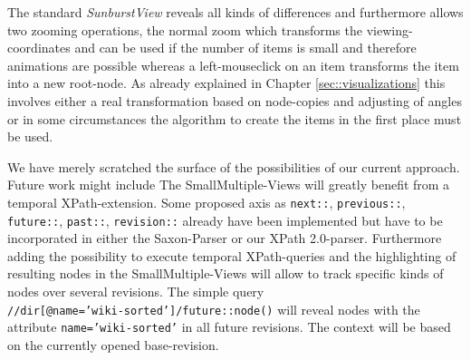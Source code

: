 The standard \emph{SunburstView} reveals all kinds of differences and furthermore allows two zooming operations, the normal zoom which transforms the viewing-coordinates and can be used if the number of items is small and therefore animations are possible whereas a left-mouseclick on an item transforms the item into a new root-node. As already explained in Chapter \ref{sec::visualizations} this involves either a real transformation based on node-copies and adjusting of angles or in some circumstances the algorithm to create the items in the first place must be used.

We have merely scratched the surface of the possibilities of our current approach. Future work might include  The SmallMultiple-Views will greatly benefit from a temporal XPath-extension. Some proposed axis as \texttt{next::}, \texttt{previous::}, \texttt{future::}, \texttt{past::}, \texttt{revision::} already have been implemented but have to be incorporated in either the Saxon-Parser or our XPath 2.0-parser. Furthermore adding the possibility to execute temporal XPath-queries and the highlighting of resulting nodes in the SmallMultiple-Views will allow to track specific kinds of nodes over several revisions. The simple query \\\texttt{//dir[@name='wiki-sorted']/future::node()} will reveal nodes with the attribute \texttt{name='wiki-sorted'} in all future revisions. The context will be based on the currently opened base-revision. 








